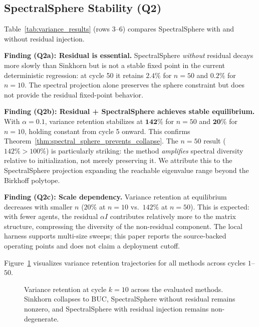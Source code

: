 \subsection{SpectralSphere Stability (Q2)}
\label{sec:experiments_spectral}

Table~\ref{tab:variance_results} (rows 3--6) compares SpectralSphere with and without
residual injection.

\textbf{Finding (Q2a): Residual is essential.}
SpectralSphere \emph{without} residual decays more slowly than Sinkhorn but is not a
stable fixed point in the current deterministic regression: at cycle 50 it retains
$2.4\%$ for $n{=}50$ and $0.2\%$ for $n{=}10$.  The spectral projection alone preserves
the sphere constraint but does not provide the residual fixed-point behavior.

\textbf{Finding (Q2b): Residual + SpectralSphere achieves stable equilibrium.}
With $\alpha{=}0.1$, variance retention stabilizes at $\mathbf{142\%}$ for $n{=}50$ and
$\mathbf{20\%}$ for $n{=}10$, holding constant from cycle 5 onward.  This confirms
Theorem~\ref{thm:spectral_sphere_prevents_collapse}.  The $n{=}50$ result ($142\% > 100\%$)
is particularly striking: the method \emph{amplifies} spectral diversity relative to
initialization, not merely preserving it.  We attribute this to the SpectralSphere
projection expanding the reachable eigenvalue range beyond the Birkhoff polytope.

\textbf{Finding (Q2c): Scale dependency.}
Variance retention at equilibrium decreases with smaller $n$ ($20\%$ at $n{=}10$ vs.\
$142\%$ at $n{=}50$).  This is expected: with fewer agents, the residual $\alpha I$
contributes relatively more to the matrix structure, compressing the diversity of the
non-residual component.  The local harness supports multi-size sweeps; this paper
reports the source-backed operating points and does not claim a deployment cutoff.

Figure~\ref{fig:variance_comparison} visualizes variance retention trajectories for all
methods across cycles $1$--$50$.

\begin{figure}[t]
  \centering
  
  \caption{Variance retention at cycle $k=10$ across the evaluated methods. Sinkhorn
    collapses to BUC, SpectralSphere without residual remains nonzero, and
    SpectralSphere with residual injection remains non-degenerate.}
  \label{fig:variance_comparison}
\end{figure}

